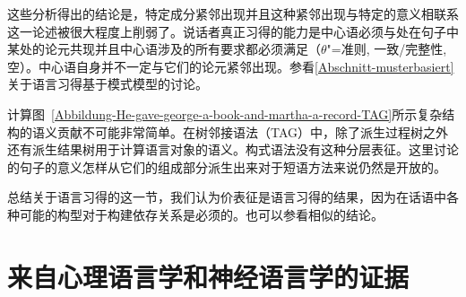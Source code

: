 \begin{exe}
\begin{xlist}[iv.]
\begin{exe}
\begin{xlist}[iv.]
这些分析得出的结论是，特定成分紧邻出现并且这种紧邻出现与特定的意义相联系这一论述被很大程度上削弱了。说话者真正习得的能力是中心语必须与处在句子中某处的论元共现并且中心语涉及的所有要求都必须满足（$\theta$"=准则, 一致/完整性,空\subcatlc）。中心语自身并不一定与它们的论元紧邻出现。参看\ref{Abschnitt-musterbasiert}关于语言习得基于模式模型的讨论。

计算图~\ref{Abbildung-He-gave-george-a-book-and-martha-a-record-TAG}所示复杂结构的语义贡献不可能非常简单。在树邻接语法\indextagc（TAG）中，除了派生过程树之外还有派生结果树用于计算语言对象的语义。构式语法没有这种分层表征。这里讨论的句子的意义怎样从它们的组成部分派生出来对于短语方法来说仍然是开放的。

总结关于语言习得的这一节，我们认为价表征是语言习得的结果，因为在话语中各种可能的构型对于构建依存关系是必须的。也可以参看相似的结论。

\section{来自心理语言学和神经语言学的证据}


\end{xlist}
\end{exe}
\end{xlist}
\end{exe}
